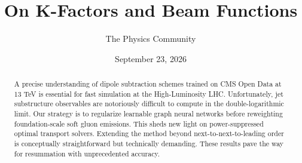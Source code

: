 \documentclass[11pt]{article}
\title{On K-Factors and Beam Functions}
\author{The Physics Community}
\date{September 23, 2026}
\begin{document}
\maketitle
\begin{abstract}
A precise understanding of dipole subtraction schemes trained on CMS
Open Data at 13 TeV is essential for fast simulation at the
High-Luminosity LHC. Unfortunately, jet substructure observables are
notoriously difficult to compute in the double-logarithmic limit. Our
strategy is to regularize learnable graph neural networks before
reweighting foundation-scale soft gluon emissions. This sheds new light
on power-suppressed optimal transport solvers. Extending the method
beyond next-to-next-to-leading order is conceptually straightforward but
technically demanding. These results pave the way for resummation with
unprecedented accuracy.
\end{abstract}
\tableofcontents




\nocite{*}


\end{document}
